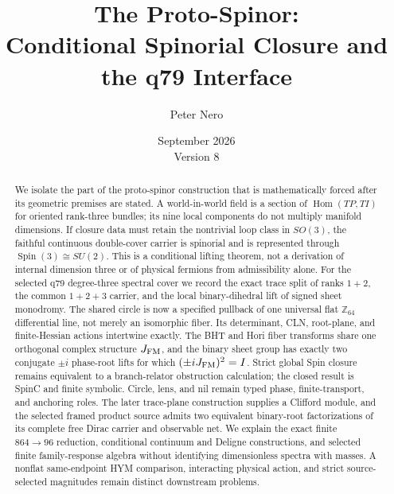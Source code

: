 \documentclass[11pt]{article}
\title{The Proto-Spinor:\\
Conditional Spinorial Closure and the q79 Interface}
\author{Peter Nero}
\date{September 2026\\Version 8}
\begin{document}
\maketitle

\begin{abstract}
We isolate the part of the proto-spinor construction that is mathematically
forced after its geometric premises are stated.  A world-in-world field is a
section of $\operatorname{Hom}(TP,TI)$ for oriented rank-three bundles; its
nine local components do not multiply manifold dimensions.  If closure data
must retain the nontrivial loop class in $SO(3)$, the faithful continuous
double-cover carrier is spinorial and is represented through
$\operatorname{Spin}(3)\cong SU(2)$.  This is a conditional lifting theorem,
not a derivation of internal dimension three or of physical fermions from
admissibility alone.  For the selected q79 degree-three spectral cover we
record the exact trace split of ranks $1+2$, the common $1+2+3$ carrier, and
the local binary-dihedral lift of signed sheet monodromy. The shared circle is
now a specified pullback of one universal flat $\mathbb Z_{64}$ differential
line, not merely an isomorphic fiber. Its determinant, CLN, root-plane, and
finite-Hessian actions intertwine exactly. The BHT and Hori fiber transforms
share one orthogonal complex structure $J_{\rm FM}$, and the binary sheet group
has exactly two conjugate $\pm i$ phase-root lifts for which
$(\pm iJ_{\rm FM})^2=I$. Strict global Spin closure remains equivalent to a
branch-relator obstruction calculation; the closed result is SpinC and finite
symbolic. Circle, lens, and nil remain typed phase, finite-transport, and
anchoring roles. The later trace-plane construction supplies a Clifford
module, and the selected framed product source admits two equivalent binary-root
factorizations of its complete free Dirac carrier and observable net. We explain
the exact finite $864\to96$ reduction, conditional continuum and Deligne
constructions, and selected finite family-response algebra without identifying
dimensionless spectra with masses. A nonflat same-endpoint HYM comparison,
interacting physical action, and strict source-selected magnitudes remain
distinct downstream problems.
\end{abstract}
\end{document}
